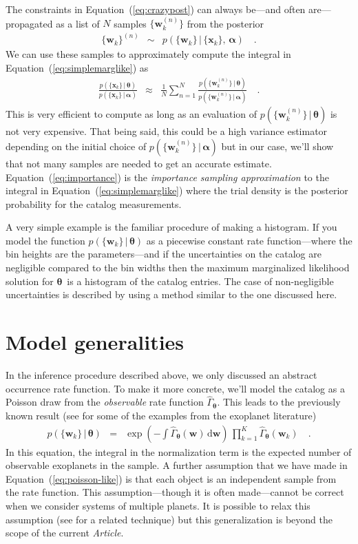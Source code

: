 \documentclass[12pt,preprint]{aastex}
\newcommand{\paper}{\textsl{Article}}
\newcommand{\Eq}[1]{Equation~(\ref{eq:#1})}
\newcommand{\eq}[1]{\Eq{#1}}
\newcommand{\eqlabel}[1]{\label{eq:#1}}
\newcommand{\sectlabel}[1]{\label{sect:#1}}
\newcommand{\dd}{\ensuremath{\,\mathrm{d}}}
\newcommand{\bvec}[1]{\ensuremath{\boldsymbol{#1}}}
\newcommand{\rate}{\ensuremath{\Gamma}}
\newcommand{\ratepar}{{\ensuremath{\theta}}}
\newcommand{\ratepars}{{\ensuremath{\bvec{\ratepar}}}}
\newcommand{\obs}[1]{\ensuremath{\hat{#1}}}
\newcommand{\data}{{\ensuremath{\bvec{x}}}}
\newcommand{\entry}{{\ensuremath{\bvec{w}}}}
\newcommand{\interim}{{\ensuremath{\bvec{\alpha}}}}
\begin{document}
The constraints in \eq{crazypost} can always be---and often are---propagated
as a list of $N$ samples $\{\entry_k^{(n)}\}$ from the posterior
\begin{eqnarray}
\{\entry_k\}^{(n)} &\sim& p(\{\entry_k\}\,|\,\{\data_k\},\,\interim) \quad.
\end{eqnarray}
We can use these samples to approximately compute the integral in
\eq{simplemarglike} as
\begin{eqnarray}\eqlabel{importance}
\frac{p(\{\data_k\}\,|\,\ratepars)}{p(\{\data_k\}\,|\,\interim)} &\approx&
    \frac{1}{N} \sum_{n=1}^N
    \frac{p(\{\entry_k^{(n)}\}\,|\,\ratepars)}
         {p(\{\entry_k^{(n)}\}\,|\,\interim)} \quad.
\end{eqnarray}
This is very efficient to compute as long as an evaluation of
$p(\{\entry_k^{(n)}\}\,|\,\ratepars)$ is not very expensive.
That being said, this could be a high variance estimator depending on the
initial choice of $p(\{\entry_k^{(n)}\}\,|\,\interim)$ but in our case, we'll
show that not many samples are needed to get an accurate estimate.
\Eq{importance} is the \emph{importance sampling approximation} to the
integral in \eq{simplemarglike} where the trial density is the posterior
probability for the catalog measurements.

A very simple example is the familiar procedure of making a histogram.
If you model the function $p(\{\entry_k\}\,|\,\ratepars)$ as a piecewise
constant rate function---where the bin heights are the parameters---and if the
uncertainties on the catalog are negligible compared to the bin widths then
the maximum marginalized likelihood solution for \ratepars\ is a histogram of
the catalog entries.
The case of non-negligible uncertainties is described by \citet{hogge} using a
method similar to the one discussed here.

\section{Model generalities}
\sectlabel{model}

In the inference procedure described above, we only discussed an abstract
occurrence rate function.
To make it more concrete, we'll model the catalog as a Poisson draw from the
\emph{observable} rate function $\obs{\rate}_\ratepars$.
This leads to the previously known result (see \citealt{tabachnik,youdin} for
some of the examples from the exoplanet literature)
\begin{eqnarray}\eqlabel{poisson-like}
p(\{\entry_k\}\,|\,\ratepars) &=&
    \exp\left(-\int \obs{\rate}_\ratepars (\entry) \dd\entry\right) \,
    \prod_{k=1}^K \obs{\rate}_\ratepars (\entry_k)\quad.
\end{eqnarray}
In this equation, the integral in the normalization term is the expected
number of observable exoplanets in the sample.
A further assumption that we have made in \eq{poisson-like} is that each
object is an independent sample from the rate function.
This assumption---though it is often made---cannot be correct when we consider
systems of multiple planets.
It is possible to relax this assumption (see \citealt{tremaine} for a related
technique) but this generalization is beyond the scope of the current \paper.
\end{document}
